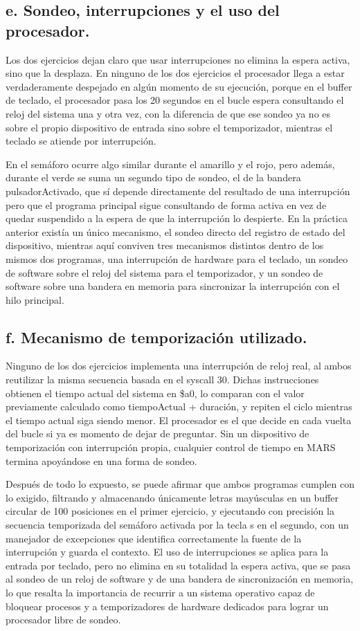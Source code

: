 \documentclass[12pt, letterpaper]{article}
\begin{document}
\subsection*{e. Sondeo, interrupciones y el uso del procesador.}
Los dos ejercicios dejan claro que usar interrupciones no elimina la espera activa, sino que la desplaza. En ninguno de los dos ejercicios el procesador llega a estar verdaderamente despejado en algún momento de su ejecución, porque en el buffer de teclado, el procesador pasa los 20 segundos en el bucle espera consultando el reloj del sistema una y otra vez, con la diferencia de que ese sondeo ya no es sobre el propio dispositivo de entrada sino sobre el temporizador, mientras el teclado se atiende por interrupción.

En el semáforo ocurre algo similar durante el amarillo y el rojo, pero además, durante el verde se suma un segundo tipo de sondeo, el de la bandera pulsadorActivado, que sí depende directamente del resultado de una interrupción pero que el programa principal sigue consultando de forma activa en vez de quedar suspendido a la espera de que la interrupción lo despierte. En la práctica anterior existía un único mecanismo, el sondeo directo del registro de estado del dispositivo, mientras aquí conviven tres mecanismos distintos dentro de los mismos dos programas, una interrupción de hardware para el teclado, un sondeo de software sobre el reloj del sistema para el temporizador, y un sondeo de software sobre una bandera en memoria para sincronizar la interrupción con el hilo principal.

\subsection*{f. Mecanismo de temporización utilizado.}
Ninguno de los dos ejercicios implementa una interrupción de reloj real, al ambos reutilizar la misma secuencia basada en el syscall 30. Dichas instrucciones obtienen el tiempo actual del sistema en \$a0, lo comparan con el valor previamente calculado como tiempoActual + duración, y repiten el ciclo mientras el tiempo actual siga siendo menor. El procesador es el que decide en cada vuelta del bucle si ya es momento de dejar de preguntar. Sin un dispositivo de temporización con interrupción propia, cualquier control de tiempo en MARS termina apoyándose en una forma de sondeo.

Después de todo lo expuesto, se puede afirmar que ambos programas cumplen con lo exigido, filtrando y almacenando únicamente letras mayúsculas en un buffer circular de 100 posiciones en el primer ejercicio, y ejecutando con precisión la secuencia temporizada del semáforo activada por la tecla s en el segundo, con un manejador de excepciones que identifica correctamente la fuente de la interrupción y guarda el contexto. El uso de interrupciones se aplica para la entrada por teclado, pero no elimina en su totalidad la espera activa, que se pasa al sondeo de un reloj de software y de una bandera de sincronización en memoria, lo que resalta la importancia de recurrir a un sistema operativo capaz de bloquear procesos y a temporizadores de hardware dedicados para lograr un procesador libre de sondeo.
\end{document}
